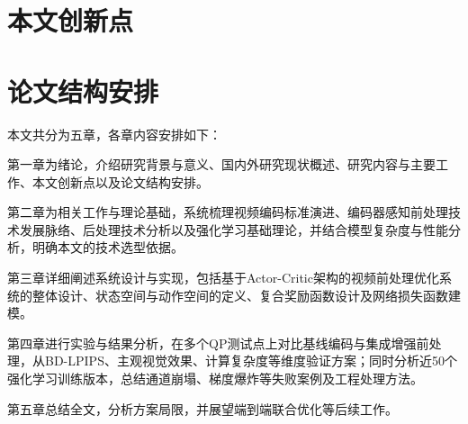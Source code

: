 \section{本文创新点}



\section{论文结构安排}

本文共分为五章，各章内容安排如下：

第一章为绪论，介绍研究背景与意义、国内外研究现状概述、研究内容与主要工作、本文创新点以及论文结构安排。

第二章为相关工作与理论基础，系统梳理视频编码标准演进、编码器感知前处理技术发展脉络、后处理技术分析以及强化学习基础理论，并结合模型复杂度与性能分析，明确本文的技术选型依据。

第三章详细阐述系统设计与实现，包括基于Actor-Critic架构的视频前处理优化系统的整体设计、状态空间与动作空间的定义、复合奖励函数设计及网络损失函数建模。

第四章进行实验与结果分析，在多个QP测试点上对比基线编码与集成增强前处理，从BD-LPIPS、主观视觉效果、计算复杂度等维度验证方案；同时分析近50个强化学习训练版本，总结通道崩塌、梯度爆炸等失败案例及工程处理方法。

第五章总结全文，分析方案局限，并展望端到端联合优化等后续工作。
